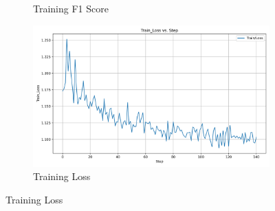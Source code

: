 \documentclass[12pt]{article}
\begin{document}
\begin{figure}[!ht]
\begin{subfigure}[b]{0.32\textwidth}
		\caption{Training F1 Score}
	\end{subfigure}
	\hfill
	\begin{subfigure}[b]{0.32\textwidth}
		\includegraphics[width=\linewidth]{BERT_Train_Loss.png}
		\caption{Training Loss}
	\end{subfigure}
	

\end{figure}
\end{document}
